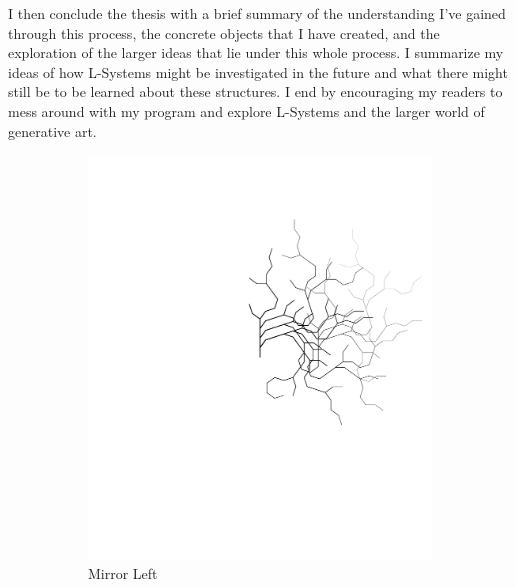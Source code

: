 \documentclass[12pt,twoside]{reedthesis}
\begin{document}
	I then conclude the thesis with a brief summary of the understanding I've gained through this process, the concrete objects that I have created, and the exploration of the larger ideas that lie under this whole process. I summarize my ideas of how L-Systems might be investigated in the future and what there might still be to be learned about these structures. I end by encouraging my readers to mess around with my program and explore L-Systems and the larger world of generative art.
	
	\begin{figure}[h]
	\begin{subfigure}{0.5\textwidth}
		\centering
		\includegraphics[clip=true, viewport=4in 3.5in 10in 10in, scale = 0.5]{Images/ThePathWeWillFollow4A}
		\caption[Mirror Left]{Mirror Left\footnotemark}
		\label {MirrorLeft}
	\end{subfigure}
	\begin{subfigure}{0.5\textwidth}
		\centering

\end{subfigure}
\end{figure}
\end{document}
